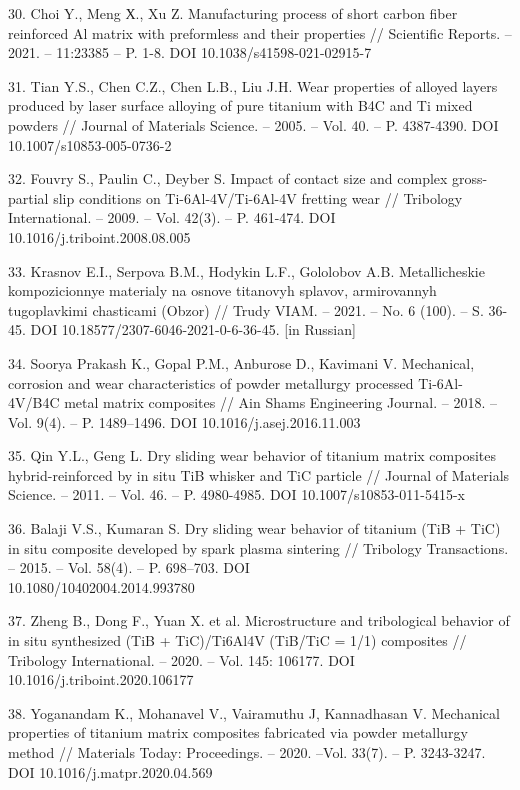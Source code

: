 \begin{references}
30. Choi Y., Meng Х., Xu Z. Manufacturing process of short carbon fiber
reinforced Al matrix with preformless and their properties // Scientific
Reports. -- 2021. -- 11:23385 -- P. 1-8. DOI 10.1038/s41598-021-02915-7

31. Tian Y.S., Chen C.Z., Chen L.B., Liu J.H. Wear properties of alloyed
layers produced by laser surface alloying of pure titanium with B4C and
Ti mixed powders // Journal of Materials Science. -- 2005. -- Vol. 40.
-- P. 4387-4390. DOI 10.1007/s10853-005-0736-2

32. Fouvry S., Paulin C., Deyber S. Impact of contact size and complex
gross-partial slip conditions on Ti-6Al-4V/Ti-6Al-4V fretting wear //
Tribology International. -- 2009. -- Vol. 42(3). -- P. 461-474. DOI
10.1016/j.triboint.2008.08.005

33. Krasnov E.I., Serpova B.M., Hodykin L.F., Gololobov A.B.
Metallicheskie kompozicionnye materialy na osnove titanovyh splavov,
armirovannyh tugoplavkimi chasticami (Obzor) // Trudy VIAM. -- 2021. --
No. 6 (100). -- S. 36-45. DOI 10.18577/2307-6046-2021-0-6-36-45. {[}in
Russian{]}

34. Soorya Prakash K., Gopal P.M., Anburose D., Kavimani V. Mechanical,
corrosion and wear characteris\-tics of powder metallurgy processed
Ti-6Al-4V/B4C metal matrix composites // Ain Shams Engineering Journal.
-- 2018. -- Vol. 9(4). -- P. 1489--1496. DOI 10.1016/j.asej.2016.11.003

35. Qin Y.L., Geng L. Dry sliding wear behavior of titanium matrix
composites hybrid-reinforced by in situ TiB whisker and TiC particle //
Journal of Materials Science. -- 2011. -- Vol. 46. -- P. 4980-4985. DOI
10.1007/s10853-011-5415-x

36. Balaji V.S., Kumaran S. Dry sliding wear behavior of titanium (TiB +
TiC) in situ composite developed by spark plasma sintering // Tribology
Transactions. -- 2015. -- Vol. 58(4). -- P. 698--703. DOI\\
10.1080/10402004.2014.993780

37. Zheng B., Dong F., Yuan X. et al. Microstructure and tribological
behavior of in situ synthesized (TiB + TiC)/Ti6Al4V (TiB/TiC = 1/1)
composites // Tribology International. -- 2020. -- Vol. 145: 106177. DOI
10.1016/j.triboint.2020.106177

38. Yoganandam K., Mohanavel V., Vairamuthu J, Kannadhasan V. Mechanical
properties of titanium matrix composites fabricated via powder
metallurgy method // Materials Today: Proceedings. -- 2020. --Vol.
33(7). -- P. 3243-3247. DOI 10.1016/j.matpr.2020.04.569


\end{references}
